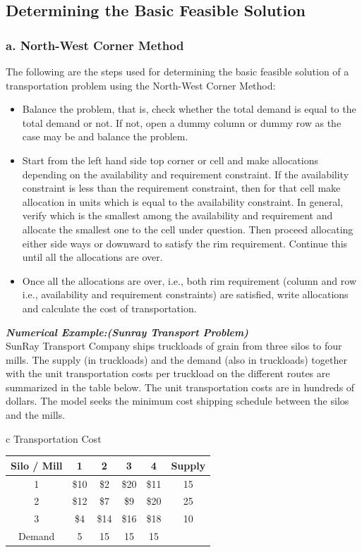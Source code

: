 \subsection{Determining the Basic Feasible Solution}
%
\subsubsection{a. North-West Corner Method}
The following are the steps used for determining the basic feasible solution of a transportation problem using the North-West Corner Method:
\begin{itemize}
	\item Balance the problem, that is, check whether the total demand is equal to the total demand or not. If not, open a dummy column or dummy row as the case may be and balance the problem.
	\item Start from the left hand side top corner or cell and make allocations depending on the availability and requirement constraint. If the availability constraint is less than the requirement constraint, then for that cell make allocation in units which is equal to the availability constraint. In general, verify which is the smallest among the availability and requirement and allocate the smallest one to the cell under question. Then proceed allocating either side ways or downward to satisfy the rim requirement. Continue this until all the allocations are over.
	\item Once all the allocations are over, i.e., both rim requirement (column and row i.e., availability and requirement constraints) are satisfied, write allocations and calculate the cost of transportation.
\end{itemize}
\textbf{\textit{Numerical Example:(Sunray Transport Problem)}}\\
SunRay Transport Company ships truckloads of grain from three silos to four mills. The supply (in truckloads) and the demand (also in truckloads) together with the unit transportation costs per truckload on the different routes are summarized in the table below. The unit transportation costs are in hundreds of dollars. The model seeks the minimum cost shipping schedule between the silos and the mills.
\begin{center}
	\begin{tabular}{c}
		Transportation Cost\\
		 \hline
		\begin{tabular}{c | c | c | c | c | c}
			Silo / Mill \cellcolor{cyan} & 1 \cellcolor{cyan} & 2 \cellcolor{cyan} & 3 \cellcolor{cyan} & 4 \cellcolor{cyan} & Supply \cellcolor{cyan}\\
			\hline
			1 \cellcolor{cyan} & \$10 & \$2 & \$20 & \$11 & 15\\
			\hline
			2 \cellcolor{cyan} & \$12 & \$7 & \$9 & \$20 & 25\\
			\hline
			3 \cellcolor{cyan} & \$4 & \$14 & \$16 & \$18 & 10\\
			\hline
			Demand \cellcolor{cyan} & 5 & 15 & 15 & 15 & 
		\end{tabular}
	\end{tabular}
\end{center}

